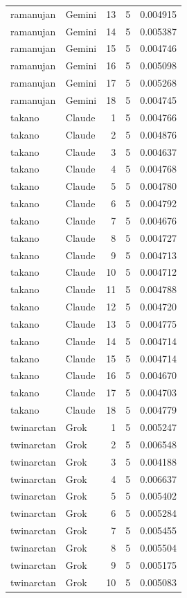 \begin{longtable}{llrrr}
ramanujan & Gemini & 13 & 5 & 0.004915\\
ramanujan & Gemini & 14 & 5 & 0.005387\\
ramanujan & Gemini & 15 & 5 & 0.004746\\
ramanujan & Gemini & 16 & 5 & 0.005098\\
ramanujan & Gemini & 17 & 5 & 0.005268\\
ramanujan & Gemini & 18 & 5 & 0.004745\\
takano & Claude & 1 & 5 & 0.004766\\
takano & Claude & 2 & 5 & 0.004876\\
takano & Claude & 3 & 5 & 0.004637\\
takano & Claude & 4 & 5 & 0.004768\\
takano & Claude & 5 & 5 & 0.004780\\
takano & Claude & 6 & 5 & 0.004792\\
takano & Claude & 7 & 5 & 0.004676\\
takano & Claude & 8 & 5 & 0.004727\\
takano & Claude & 9 & 5 & 0.004713\\
takano & Claude & 10 & 5 & 0.004712\\
takano & Claude & 11 & 5 & 0.004788\\
takano & Claude & 12 & 5 & 0.004720\\
takano & Claude & 13 & 5 & 0.004775\\
takano & Claude & 14 & 5 & 0.004714\\
takano & Claude & 15 & 5 & 0.004714\\
takano & Claude & 16 & 5 & 0.004670\\
takano & Claude & 17 & 5 & 0.004703\\
takano & Claude & 18 & 5 & 0.004779\\
twinarctan & Grok & 1 & 5 & 0.005247\\
twinarctan & Grok & 2 & 5 & 0.006548\\
twinarctan & Grok & 3 & 5 & 0.004188\\
twinarctan & Grok & 4 & 5 & 0.006637\\
twinarctan & Grok & 5 & 5 & 0.005402\\
twinarctan & Grok & 6 & 5 & 0.005284\\
twinarctan & Grok & 7 & 5 & 0.005455\\
twinarctan & Grok & 8 & 5 & 0.005504\\
twinarctan & Grok & 9 & 5 & 0.005175\\
twinarctan & Grok & 10 & 5 & 0.005083\\

\end{longtable}
